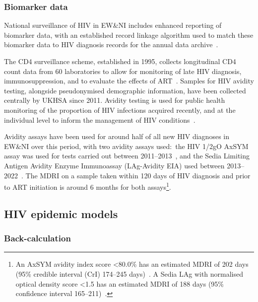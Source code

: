 \subsubsection{Biomarker data}

National surveillance of HIV in EW\&NI includes enhanced reporting of biomarker data, with an established record linkage algorithm used to match these biomarker data to HIV diagnosis records for the annual data archive~\parencite{Rice2017-pr, Winter2016-ue}.

The CD4 surveillance scheme, established in 1995, collects longitudinal CD4 count data from 60 laboratories to allow for monitoring of late HIV diagnosis, immunosuppression, and to evaluate the effects of ART~\parencite{Public_Health_England2013-zl}. Samples for HIV avidity testing, alongside pseudonymised demographic information, have been collected centrally by UKHSA since 2011. Avidity testing is used for public health monitoring of the proportion of HIV infections acquired recently, and at the individual level to inform the management of HIV conditions~\parencite{Aghaizu2014-hl}.

Avidity assays have been used for around half of all new HIV diagnoses in EW\&NI over this period, with two avidity assays used:\ the HIV 1/2gO AxSYM assay was used for tests carried out between 2011--2013~\parencite{Suligoi2002-di}, and the Sedia Limiting Antigen Avidity Enzyme Immunoassay (LAg-Avidity EIA) used between 2013--2022~\parencite{Sedia_Biosciences_Corporation2013-ff}. The MDRI on a sample taken within 120 days of HIV diagnosis and prior to ART initiation is around 6 months for both assays\footnote{An AxSYM avidity index score <80.0\% has an estimated MDRI of 202 days (95\% credible interval (CrI) 174--245 days)~\parencite{Sweeting2010-hm}. A Sedia LAg with normalised optical density score <1.5 has an estimated MDRI of 188 days (95\% confidence interval 165--211)~\parencite{Kassanjee2014-gc}.}.

\subsection{HIV epidemic models}

\subsubsection{Back-calculation}


